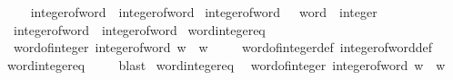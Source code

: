 \begin{isabellebody}
\ \ \isanewline
\ \ {\isachardoublequoteopen}integer{\isacharunderscore}{\kern0pt}of{\isacharunderscore}{\kern0pt}word{}{}\ {\isasymequiv}\ integer{\isacharunderscore}{\kern0pt}of{\isacharunderscore}{\kern0pt}word{\isachardoublequoteclose}\isanewline
\isanewline
{}\isamarkupfalse%
\ integer{\isacharunderscore}{\kern0pt}of{\isacharunderscore}{\kern0pt}word{}{}\ {\isacharcolon}{\kern0pt}{\isacharcolon}{\kern0pt}\ {\isachardoublequoteopen}{}{}\ word\ {\isasymRightarrow}\ integer{\isachardoublequoteclose}\isanewline
\ \ \isanewline
\ \ {\isachardoublequoteopen}integer{\isacharunderscore}{\kern0pt}of{\isacharunderscore}{\kern0pt}word{}{}\ {\isasymequiv}\ integer{\isacharunderscore}{\kern0pt}of{\isacharunderscore}{\kern0pt}word{\isachardoublequoteclose}\isanewline
\isanewline
{}\isamarkupfalse%
\ word{}{\isacharunderscore}{\kern0pt}integer{\isacharunderscore}{\kern0pt}eq{\isacharcolon}{\kern0pt}\isanewline
\ \ {\isachardoublequoteopen}word{}{\isacharunderscore}{\kern0pt}of{\isacharunderscore}{\kern0pt}integer\ {\isacharparenleft}{\kern0pt}integer{\isacharunderscore}{\kern0pt}of{\isacharunderscore}{\kern0pt}word{}\ w{\isacharparenright}{\kern0pt}\ {\isacharequal}{\kern0pt}\ w{\isachardoublequoteclose}\ \isanewline
%
\isadelimproof
\ \ %
\endisadelimproof
%
\isatagproof
{}\isamarkupfalse%
\ word{}{\isacharunderscore}{\kern0pt}of{\isacharunderscore}{\kern0pt}integer{\isacharunderscore}{\kern0pt}def\ integer{\isacharunderscore}{\kern0pt}of{\isacharunderscore}{\kern0pt}word{}{\isacharunderscore}{\kern0pt}def\isanewline
\ \ \isamarkupfalse%
\ word{\isacharunderscore}{\kern0pt}integer{\isacharunderscore}{\kern0pt}eq\ \isanewline
\ \ \isamarkupfalse%
\ blast%
\endisatagproof
{\isafoldproof}%
%
\isadelimproof
\isanewline
%
\endisadelimproof
\isanewline
{}\isamarkupfalse%
\ word{}{}{\isacharunderscore}{\kern0pt}integer{\isacharunderscore}{\kern0pt}eq{\isacharcolon}{\kern0pt}\isanewline
\ \ {\isachardoublequoteopen}word{}{}{\isacharunderscore}{\kern0pt}of{\isacharunderscore}{\kern0pt}integer\ {\isacharparenleft}{\kern0pt}integer{\isacharunderscore}{\kern0pt}of{\isacharunderscore}{\kern0pt}word{}{}\ w{\isacharparenright}{\kern0pt}\ {\isacharequal}{\kern0pt}\ w{\isachardoublequoteclose}\ \isanewline
%
\isadelimproof

\end{isabellebody}
